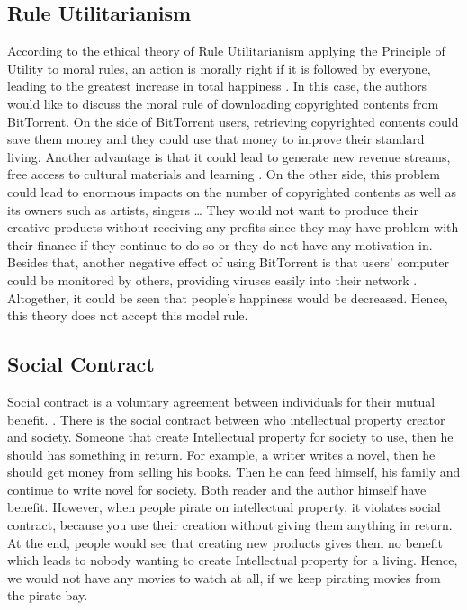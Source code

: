 \documentclass[conference]{IEEEtran}
\begin{document}
\subsection{Rule Utilitarianism}
According to the ethical theory of Rule Utilitarianism applying the Principle of Utility to moral rules, an action is morally right if it is followed by everyone, leading to the greatest increase in total happiness \cite{quinn2014ethics}. In this case, the authors would like to discuss the moral rule of downloading copyrighted contents from BitTorrent. On the side of BitTorrent users, retrieving copyrighted contents could save them money and they could use that money to improve their standard living. Another advantage is that it could lead to generate new revenue streams, free access to cultural materials and learning \cite{bittorenethics} . On the other side, this problem could lead to enormous impacts on the number of copyrighted contents as well as its owners such as artists, singers … They would not want to produce their creative products without receiving any profits since they may have problem with their finance if they continue to do so or they do not have any motivation in. Besides that, another negative effect of using BitTorrent is that users' computer could be monitored by others, providing viruses easily into their network \cite{bittorendanger}. Altogether, it could be seen that people's happiness would be decreased. Hence, this theory does not accept this model rule.

\subsection{Social Contract}
Social contract is a voluntary agreement between individuals for their mutual benefit. \cite{quinn2014ethics}. There is the social contract between who intellectual property creator and society. Someone that  create Intellectual property for society to use, then he should has something in return. For example, a writer writes a novel, then he should get money from selling his books. Then he can feed himself, his family and continue to write novel for society. Both reader and the author himself have benefit. However, when people pirate on intellectual property, it violates social contract, because you use their creation without giving them anything in return. At the end, people would see that creating new products gives them no benefit which leads to nobody wanting to create Intellectual property for a living. Hence, we would not have any movies to watch at all, if we keep pirating movies from the pirate bay. 
\end{document}
